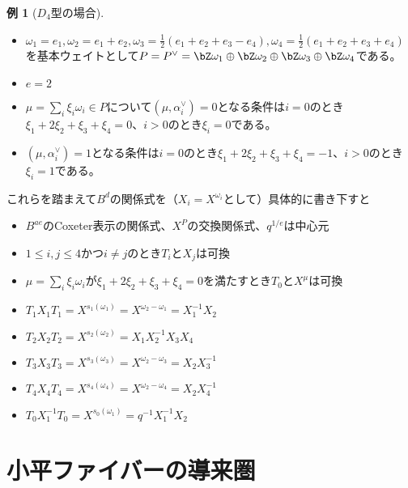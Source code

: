 \documentclass[uplatex, a4paper, dvipdfmx]{jsarticle}
\theoremstyle{definition}
\newtheorem{example}[theorem]{例}
\begin{document}
\begin{example}[$D_4$型の場合]
    \begin{itemize}
        \item $\omega_1 = e_1, \omega_2 = e_1 + e_2, \omega_3 = \frac{1}{2}(e_1 + e_2 + e_3 - e_4), \omega_4 = \frac{1}{2}(e_1 + e_2 + e_3 + e_4)$を基本ウェイトとして$P = P^\vee = \bZ \omega_1 \oplus \bZ \omega_2 \oplus \bZ \omega_3 \oplus \bZ \omega_4$である。
        \item $e = 2$
        \item $\mu = \sum_i \xi_i \omega_i \in P$について$(\mu, \alpha_i^\vee) = 0$となる条件は$i=0$のとき$\xi_1 + 2\xi_2 + \xi_3 + \xi_4 = 0$、$i > 0$のとき$\xi_i = 0$である。
        \item $(\mu, \alpha_i^\vee) = 1$となる条件は$i=0$のとき$\xi_1 + 2\xi_2 + \xi_3 + \xi_4 = -1$、$i > 0$のとき$\xi_i = 1$である。
    \end{itemize}
    これらを踏まえて$B^d$の関係式を（$X_i = X^{\omega_i}$として）具体的に書き下すと
    \begin{itemize}
        \item $B^{ae}$のCoxeter表示の関係式、$X^P$の交換関係式、$q^{1/e}$は中心元
        \item $1\leq i, j \leq 4$かつ$i \neq j$のとき$T_i$と$X_j$は可換
        \item $\mu = \sum_i \xi_i \omega_i$が$\xi_1 + 2\xi_2 + \xi_3 + \xi_4 = 0$を満たすとき$T_0$と$X^\mu$は可換
        \item $T_1X_1T_1 = X^{s_1(\omega_1)} = X^{\omega_2-\omega_1} = X_1^{-1}X_2$
        \item $T_2X_2T_2 = X^{s_2(\omega_2)} = X_1X_2^{-1}X_3X_4$
        \item $T_3X_3T_3 = X^{s_3(\omega_3)} = X^{\omega_2-\omega_3} = X_2X_3^{-1}$
        \item $T_4X_4T_4 = X^{s_4(\omega_4)} = X^{\omega_2-\omega_4} = X_2X_4^{-1}$
        \item $T_0X_1^{-1}T_0 = X^{s_0(\omega_1)} = q^{-1}X_1^{-1}X_2$
    \end{itemize}
\end{example}
\section{小平ファイバーの導来圏}
\end{document}
